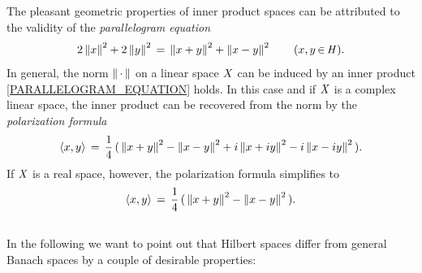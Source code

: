 \documentclass[11pt,twoside]{article}
\begin{document}
\subparagraph{} %
The pleasant geometric properties of inner product spaces
can be attributed to the validity of the \textit{parallelogram equation}
\begin{equation}\label{PARALLELOGRAM_EQUATION}
2 \left\lVert x \right\rVert^2 + 2 \left\lVert y \right\rVert^2 \,=\, \left\lVert x+y \right\rVert^2 + \left\lVert x-y \right\rVert^2
\quad \quad (x,y {\,\in\,} \mathit{H}).
\end{equation}
In general,
the norm $\left\lVert \,\cdot\, \right\rVert$ on a linear space $\mathit{X}$
can be induced by an inner product
\iff \eqref{PARALLELOGRAM_EQUATION} holds.
In this case and if $\mathit{X}$ is a complex linear space,
the inner product can be recovered from the norm
by the \textit{polarization formula}
\[
\langle x,y \rangle
\,=\,
\frac{1}{4} \,
(\,
\left\lVert x + y \right\rVert^2 - \left\lVert x-y \right\rVert^2 +i \left\lVert x+iy \right\rVert^2 - i \left\lVert x-iy \right\rVert^2
\,).
\]
If $\mathit{X}$ is a real space,
however,
the polarization formula simplifies to
\[
\langle x,y \rangle \,=\,
\frac{1}{4} \, (\, \left\lVert x + y \right\rVert^2 - \left\lVert x-y \right\rVert^2 \,).
\]

\subsection{} %
In the following we want to point out
that Hilbert spaces differ from general Banach spaces
by a couple of desirable properties:
\end{document}
